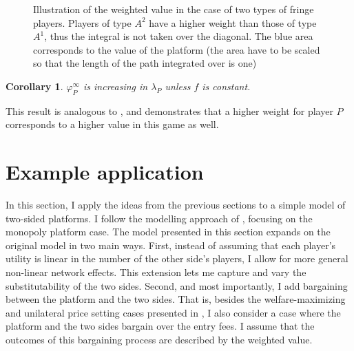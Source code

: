 \documentclass[a4paper]{article}
\newtheorem{corollary}{Corollary}
\begin{document}
\begin{figure}
    \centering
    \caption{Illustration of the weighted value in the case of two types of fringe players. Players of type $A^2$ have a higher weight than those of type $A^1$, thus the integral is not taken over the diagonal. The blue area corresponds to the value of the platform (the area have to be scaled so that the length of the path integrated over is one)}
    \label{fig:many_sided_weighted}
\end{figure}

\begin{corollary}
    \label{cor:platform_value_multiple_sides_weighted}
    $\varphi_P^\infty$ is increasing in $\lambda_P$ unless $f$ is constant.
\end{corollary}
This result is analogous to , and demonstrates that a higher weight for player $P$ corresponds to a higher value in this game as well.

\section{Example application}
\label{sec:application}

In this section, I apply the ideas from the previous sections to a simple model of two-sided platforms.
I follow the modelling approach of \textcite{armstrong2006competition}, focusing on the monopoly platform case.
The model presented in this section expands on the original model in two main ways.
First, instead of assuming that each player's utility is linear in the number of the other side's players, I allow for more general non-linear network effects. 
This extension lets me capture and vary the substitutability of the two sides.
Second, and most importantly, I add bargaining between the platform and the two sides.
That is, besides the welfare-maximizing and unilateral price setting cases presented in \textcite{armstrong2006competition}, I also consider a case where the platform and the two sides bargain over the entry fees.
I assume that the outcomes of this bargaining process are described by the weighted value.
\end{document}
